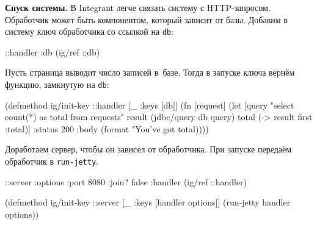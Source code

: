 
\textbf{Спуск системы.} В Integrant легче связать систему с
HTTP-запросом. Обработчик может быть компонентом, который зависит от
базы. Добавим в систему ключ обработчика со ссылкой на \verb|db|:

\begin{english}
  \begin{clojure}
{::handler {:db (ig/ref ::db)}}
  \end{clojure}
\end{english}

\noindent

Пусть страница выводит число записей в~базе. Тогда в запуске ключа вернём
функцию, замкнутую на \verb|db|:

\pagebreakafive

\ifnarrow

\begin{english}
  \begin{clojure}
(defmethod ig/init-key ::handler
  [_ {:keys [db]}]
  (fn [request]
    (let [query "select count(*) as total
                 from requests"
          result (jdbc/query db query)
          total (-> result first :total)]
      {:status 200
       :body (format
               "You've got %
               total)})))
  \end{clojure}
\end{english}

\else

\begin{english}
\end{english}

\fi

Доработаем сервер, чтобы он зависел от обработчика. При запуске передаём
обработчик в \verb|run-jetty|.

\ifnarrow

\begin{english}
  \begin{clojure}
{::server {:options {:port 8080
                     :join? false}
           :handler (ig/ref ::handler)}}

(defmethod ig/init-key ::server
  [_ {:keys [handler options]}]
  (run-jetty handler options))
  \end{clojure}
\end{english}

